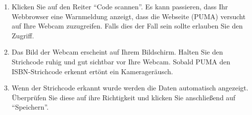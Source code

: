 \documentclass[a4paper,11pt,twoside]{scrbook}
\begin{document}
\begin{enumerate}
\begin{itemize}
        \begin{enumerate}
            \item Klicken Sie auf den Reiter \enquote{Code scannen}. Es kann passieren, dass Ihr Webbrowser eine Warnmeldung anzeigt, dass die Webseite (PUMA) versucht auf Ihre Webcam zuzugreifen. Falls dies der Fall sein sollte erlauben Sie den Zugriff.
            \item Das Bild der Webcam erscheint auf Ihrem Bildschirm. Halten Sie den Strichcode ruhig und gut sichtbar vor Ihre Webcam. Sobald PUMA den ISBN-Strichcode erkennt ertönt ein Kamerageräusch.
            \item Wenn der Strichcode erkannt wurde werden die Daten automatisch angezeigt. Überprüfen Sie diese auf ihre Richtigkeit und klicken Sie anschließend auf \enquote{Speichern}.
        \end{enumerate}
    \end{itemize}
\end{enumerate}
\end{document}
